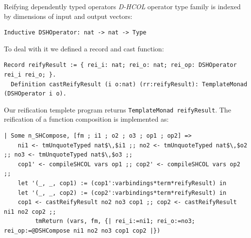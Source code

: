 \documentclass[aspectratio=169]{beamer}
\newcommand{\DHCOL}{\emph{D-HCOL}}
\begin{document}
\begin{frame}[fragile]{Reifying dependently typed operators}
  {}{\DHCOL} operator type family is indexed by dimensions of input
  and output vectors:
  \begin{lstlisting}[language=Coq, mathescape=true, frame=single]
  Inductive DSHOperator: nat -> nat -> Type
  \end{lstlisting}

  To deal with it we defined a record and cast function:

  \begin{lstlisting}[language=Coq, mathescape=true, frame=single]
  Record reifyResult := { rei_i: nat; rei_o: nat; rei_op: DSHOperator rei_i rei_o; }.
  Definition castReifyResult (i o:nat) (rr:reifyResult): TemplateMonad (DSHOperator i o).
  \end{lstlisting}

  Our reification templete program returns
  \lstinline[language=Coq]{TemplateMonad reifyResult}. The reification
  of a function composition is implemented as:

  \begin{lstlisting}[language=Coq, mathescape=true, frame=single, basicstyle=\scriptsize]
  | Some n_SHCompose, [fm ; i1 ; o2 ; o3 ; op1 ; op2] =>
    ni1 <- tmUnquoteTyped nat$\,$i1 ;; no2 <- tmUnquoteTyped nat$\,$o2 ;; no3 <- tmUnquoteTyped nat$\,$o3 ;;
    cop1' <- compileSHCOL vars op1 ;; cop2' <- compileSHCOL vars op2 ;;
    let '(_, _, cop1) := (cop1':varbindings*term*reifyResult) in
    let '(_, _, cop2) := (cop2':varbindings*term*reifyResult) in
    cop1 <- castReifyResult no2 no3 cop1 ;; cop2 <- castReifyResult ni1 no2 cop2 ;;
         tmReturn (vars, fm, {| rei_i:=ni1; rei_o:=no3; rei_op:=@DSHCompose ni1 no2 no3 cop1 cop2 |})
  \end{lstlisting}
    
\end{frame}
\end{document}
